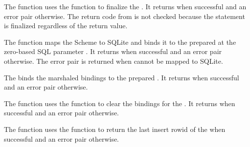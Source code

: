 \begin{function}
\end{function}

The  function uses the
 function to finalize the .  It
returns  when successful and an error pair otherwise. The
return code from  is not checked because the
statement is finalized regardless of the return value.

\begin{function}
\end{function}

The  function maps the Scheme 
to SQLite and binds it to the prepared  at the zero-based SQL
parameter .  It returns  when successful and an
error pair otherwise. The error pair  is returned when  cannot be
mapped to SQLite.

\begin{function}
\end{function}

The  binds the marshaled
bindings  to the prepared .
It returns  when successful and an
error pair otherwise.

\begin{function}
\end{function}

The  function uses the
 function to clear the bindings for the
. It returns  when successful and an error
pair otherwise.

\begin{function}
\end{function}

The  function uses the
 function to return the last insert
rowid of the  when successful and an error pair
otherwise.

